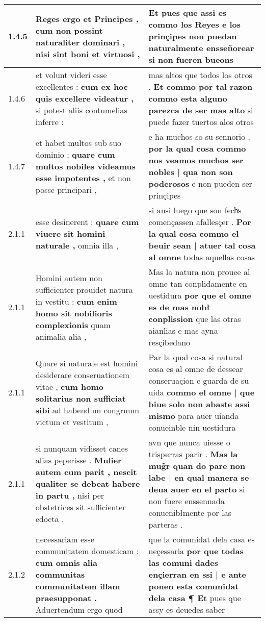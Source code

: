 \begin{tabular}{|p{1cm}|p{6.5cm}|p{6.5cm}|}
1.4.5 & Reges ergo et Principes , \textbf{ cum non possint naturaliter dominari , } nisi sint boni et virtuosi , & Et pues que assi es commo los Reyes \textbf{ e los prinçipes non puedan naturalmente ensseñorear } si non fueren bueons \\\hline
1.4.6 & et volunt videri esse excellentes : \textbf{ cum ex hoc quis excellere videatur , } si potest aliis contumelias inferre : & mas altos que todos los otros . \textbf{ Et commo por tal razon commo esta alguno parezca de ser mas alto } si puede fazer tuertos alos otros \\\hline
1.4.7 & et habet multos sub suo dominio ; \textbf{ quare cum multos nobiles videamus esse impotentes , } et non posse principari , & e ha muchos so su sennorio . \textbf{ por la qual cosa commo nos veamos muchos ser nobles | qua non son poderosos } e non pueden ser prinçipes \\\hline
2.1.1 & esse desinerent ; \textbf{ quare cum viuere sit homini naturale , } omnia illa , & si ansi luego que son fechͣs començassen afallesçer . \textbf{ Por la qual cosa commo el beuir sean | atuer tal cosa al omne } todas aquellas cosas \\\hline
2.1.1 & Homini autem non sufficienter prouidet natura in vestitu : \textbf{ cum enim homo sit nobilioris complexionis } quam animalia alia , & Mas la natura non prouee al omne tan conplidamente en uestidura \textbf{ por que el omne es de mas nobł conplission } que las otras aianlias e mas ayna resçibedano \\\hline
2.1.1 & Quare si naturale est homini desiderare conseruationem vitae , \textbf{ cum homo solitarius non sufficiat sibi } ad habendum congruum victum et vestitum , & Par la qual cosa si natural cosa es al omne de dessear conseruaçion e guarda de su uida \textbf{ commo el omne | que biue solo non abaste assi mismo } para auer uianda conueinble nin uestidura \\\hline
2.1.1 & si nunquam vidisset canes alias peperisse . \textbf{ Mulier autem cum parit , nescit qualiter se debeat habere in partu , } nisi per obstetrices sit sufficienter edocta . & avn que nunca uiesse o trisperras parir . \textbf{ Mas la mug̃r quan do pare non labe | en qual manera se deua auer en el parto } si non fuere enssennada conuenibłmente por las parteras . \\\hline
2.1.2 & necessariam esse communitatem domesticam : \textbf{ cum omnis alia communitas communitatem illam praesupponat . } Aduertendum ergo quod & que la comunidat dela casa es neçessaria \textbf{ por que todas las comuni dades ençierran en ssi | e ante ponen esta comunidat dela casa ¶ Et } pues que assy es deuedes saber \\\hline

\end{tabular}
